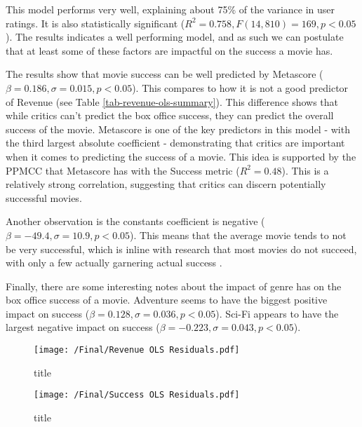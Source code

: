     This model performs very well, explaining about 75\% of the variance in user ratings.
        It is also statistically significant ($R^2=0.758, F(14,810)=169, p<0.05$).
    The results indicates a well performing model, and as such we can postulate 
        that at least some of these factors are impactful on the success a movie has.

    The results show that movie success can be well predicted by Metascore ($\beta=0.186, \sigma=0.015, p<0.05$).
    This compares to how it is not a good predictor of Revenue (see Table \ref{tab-revenue-ols-summary}).
    This difference shows that while critics can't predict the box office success, they can predict the 
        overall success of the movie.
    Metascore is one of the key predictors in this model - with the third largest absolute coefficient - 
        demonstrating that critics are important when it comes to predicting the success of a movie.
    This idea is supported by the PPMCC that Metascore has with the Success metric ($R^2=0.48$).
    This is a relatively strong correlation, suggesting that critics can discern potentially successful movies.
    
    Another observation is the constants coefficient is negative ($\beta=-49.4,\sigma=10.9,p<0.05$).
    This means that the average movie tends to not be very successful, which is inline with research that
        most movies do not succeed, with only a few actually garnering actual success \cite{}.

    Finally, there are some interesting notes about the impact of genre has on the box office success of a movie.
    Adventure seems to have the biggest positive impact on success ($\beta=0.128,\sigma=0.036,p<0.05$).
    Sci-Fi appears to have the largest negative impact on success ($\beta=-0.223,\sigma=0.043,p<0.05$).

\begin{figure}[H]
    \texttt{[image: /Final/Revenue OLS Residuals.pdf]}
    \caption[short]{title}\label{fig-revenue-ols-residuals}
\end{figure}

\begin{figure}[H]
    \texttt{[image: /Final/Success OLS Residuals.pdf]}
    \caption[short]{title}\label{fig-success-ols-residuals}
\end{figure}
